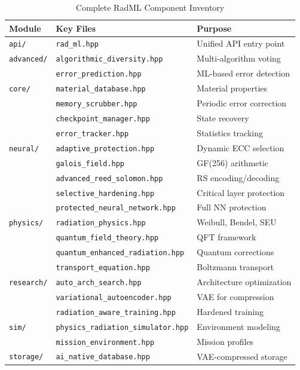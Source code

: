 \documentclass[11pt,a4paper]{article}
\begin{document}
\begin{table}[htbp]
\centering
\caption{Complete RadML Component Inventory}
\begin{tabular}{@{}lll@{}}
\toprule
\textbf{Module} & \textbf{Key Files} & \textbf{Purpose} \\
\midrule
\texttt{api/} & \texttt{rad\_ml.hpp} & Unified API entry point \\
\texttt{advanced/} & \texttt{algorithmic\_diversity.hpp} & Multi-algorithm voting \\
 & \texttt{error\_prediction.hpp} & ML-based error detection \\
\texttt{core/} & \texttt{material\_database.hpp} & Material properties \\
 & \texttt{memory\_scrubber.hpp} & Periodic error correction \\
 & \texttt{checkpoint\_manager.hpp} & State recovery \\
 & \texttt{error\_tracker.hpp} & Statistics tracking \\
\texttt{neural/} & \texttt{adaptive\_protection.hpp} & Dynamic ECC selection \\
 & \texttt{galois\_field.hpp} & GF(256) arithmetic \\
 & \texttt{advanced\_reed\_solomon.hpp} & RS encoding/decoding \\
 & \texttt{selective\_hardening.hpp} & Critical layer protection \\
 & \texttt{protected\_neural\_network.hpp} & Full NN protection \\
\texttt{physics/} & \texttt{radiation\_physics.hpp} & Weibull, Bendel, SEU \\
 & \texttt{quantum\_field\_theory.hpp} & QFT framework \\
 & \texttt{quantum\_enhanced\_radiation.hpp} & Quantum corrections \\
 & \texttt{transport\_equation.hpp} & Boltzmann transport \\
\texttt{research/} & \texttt{auto\_arch\_search.hpp} & Architecture optimization \\
 & \texttt{variational\_autoencoder.hpp} & VAE for compression \\
 & \texttt{radiation\_aware\_training.hpp} & Hardened training \\
\texttt{sim/} & \texttt{physics\_radiation\_simulator.hpp} & Environment modeling \\
 & \texttt{mission\_environment.hpp} & Mission profiles \\
\texttt{storage/} & \texttt{ai\_native\_database.hpp} & VAE-compressed storage \\

\end{tabular}
\end{table}
\end{document}
